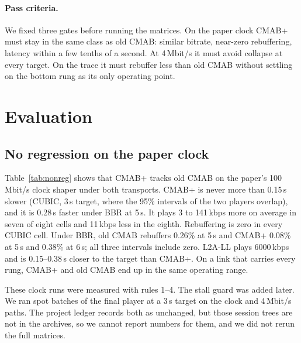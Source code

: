 \documentclass[sigconf]{acmart}
\newcommand{\cmabp}{CMAB+\xspace}
\newcommand{\oldcmab}{old CMAB\xspace}
\newcommand{\kbps}{\,kbps\xspace}
\begin{document}
\paragraph{Pass criteria.} We fixed three gates before running the matrices. On the paper clock \cmabp must stay in the same class as \oldcmab: similar bitrate, near-zero rebuffering, latency within a few tenths of a second. At 4\,Mbit/s it must avoid collapse at every target. On the trace it must rebuffer less than \oldcmab without settling on the bottom rung as its only operating point.

\section{Evaluation}
\label{sec:eval}

\subsection{No regression on the paper clock}
\label{sec:nonreg}

Table~\ref{tab:nonreg} shows that \cmabp tracks \oldcmab on the paper's 100\,Mbit/s clock shaper under both transports. \cmabp is never more than 0.15\,s slower (CUBIC, 3\,s target, where the 95\% intervals of the two players overlap), and it is 0.28\,s faster under BBR at 5\,s. It plays 3 to 141\kbps more on average in seven of eight cells and 11\kbps less in the eighth. Rebuffering is zero in every CUBIC cell. Under BBR, \oldcmab rebuffers 0.26\% at 5\,s and \cmabp 0.08\% at 5\,s and 0.38\% at 6\,s; all three intervals include zero. L2A-LL plays 6000\kbps and is 0.15--0.38\,s closer to the target than \cmabp. On a link that carries every rung, \cmabp and \oldcmab end up in the same operating range.

These clock runs were measured with rules 1--4. The stall guard was added later. We ran spot batches of the final player at a 3\,s target on the clock and 4\,Mbit/s paths. The project ledger records both as unchanged, but those session trees are not in the archives, so we cannot report numbers for them, and we did not rerun the full matrices.
\end{document}
